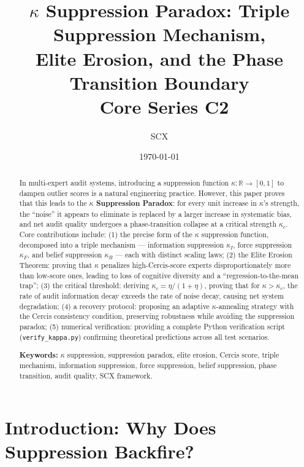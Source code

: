 \documentclass[12pt,a4paper]{article}
\title{
    \textbf{$\kappa$ Suppression Paradox: Triple Suppression Mechanism, \\ Elite Erosion, and the Phase Transition Boundary} \\[0.5em]
    \normalsize \SCX\ Core Series C2
}
\author{SCX}
\date{\today}
\theoremstyle{definition}
\newcommand{\R}{\mathbb{R}}
\newcommand{\Cercis}{\textsf{Cercis}}
\begin{document}
\maketitle

\begin{abstract}

In multi-expert audit systems, introducing a suppression function $\kappa: \R \to [0,1]$ to dampen outlier scores is a natural engineering practice. However, this paper proves that this leads to the \textbf{$\kappa$ Suppression Paradox}: for every unit increase in $\kappa$'s strength, the ``noise'' it appears to eliminate is replaced by a larger increase in systematic bias, and net audit quality undergoes a phase-transition collapse at a critical strength $\kappa_c$. Core contributions include: (1) the precise form of the $\kappa$ suppression function, decomposed into a triple mechanism --- information suppression $\kappa_I$, force suppression $\kappa_F$, and belief suppression $\kappa_B$ --- each with distinct scaling laws; (2) the Elite Erosion Theorem: proving that $\kappa$ penalizes high-\Cercis-score experts disproportionately more than low-score ones, leading to loss of cognitive diversity and a ``regression-to-the-mean trap''; (3) the critical threshold: deriving $\kappa_c = \eta/(1+\eta)$, proving that for $\kappa > \kappa_c$, the rate of audit information decay exceeds the rate of noise decay, causing net system degradation; (4) a recovery protocol: proposing an adaptive $\kappa$-annealing strategy with the Cercis consistency condition, preserving robustness while avoiding the suppression paradox; (5) numerical verification: providing a complete Python verification script (\texttt{verify\_kappa.py}) confirming theoretical predictions across all test scenarios.

\vspace{0.5em}
\noindent
\textbf{Keywords:} $\kappa$ suppression, suppression paradox, elite erosion, Cercis score, triple mechanism, information suppression, force suppression, belief suppression, phase transition, audit quality, SCX framework.
\end{abstract}

\section{Introduction: Why Does Suppression Backfire?}
\label{sec:intro}
\end{document}
